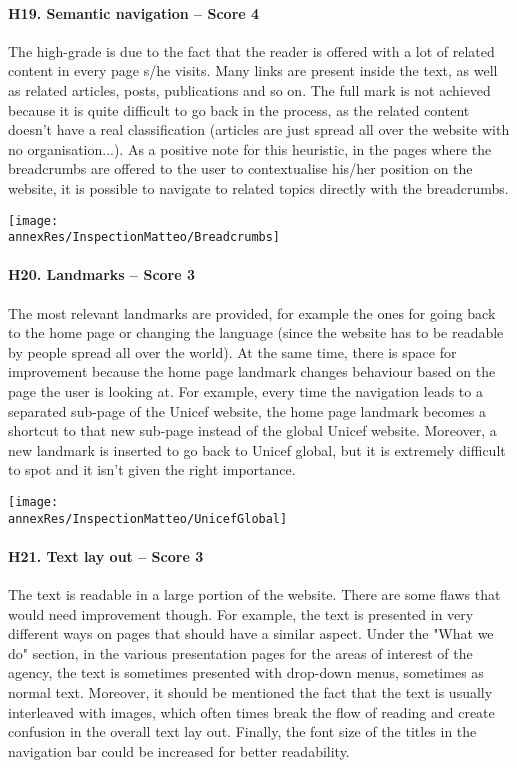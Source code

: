 \paragraph*{H19. Semantic navigation – Score 4}
The high-grade is due to the fact that the reader is offered with a lot of related content in every page s/he visits. Many links are present inside the text, as well as related articles, posts, publications and so on. The full mark is not achieved because it is quite difficult to go back in the process, as the related content doesn't have a real classification (articles are just spread all over the website with no organisation...).
As a positive note for this heuristic, in the pages where the breadcrumbs are offered to the user to contextualise his/her position on the website, it is possible to navigate to related topics directly with the breadcrumbs.\\

\begin{center}
	\texttt{[image: \\annexRes/InspectionMatteo/Breadcrumbs]}
\end{center}


\paragraph*{H20. Landmarks – Score 3}
The most relevant landmarks are provided, for example the ones for going back to the home page or changing the language (since the website has to be readable by people spread all over the world). At the same time, there is space for improvement because the home page landmark changes behaviour based on the page the user is looking at. For example, every time the navigation leads to a separated sub-page of the Unicef website, the home page landmark becomes a shortcut to that new sub-page instead of the global Unicef website. Moreover, a new landmark is inserted to go back to Unicef global, but it is extremely difficult to spot and it isn't given the right importance.

\begin{center}
	\texttt{[image: \\annexRes/InspectionMatteo/UnicefGlobal]}
\end{center}

\paragraph*{H21. Text lay out – Score 3}
The text is readable in a large portion of the website. There are some flaws that would need improvement though. For example, the text is presented in very different ways on pages that should have a similar aspect. Under the "What we do" section, in the various presentation pages for the areas of interest of the agency, the text is sometimes presented with drop-down menus, sometimes as normal text. Moreover, it should be mentioned the fact that the text is usually interleaved with images, which often times break the flow of reading and create confusion in the overall text lay out. 
Finally, the font size of the titles in the navigation bar could be increased for better readability.

